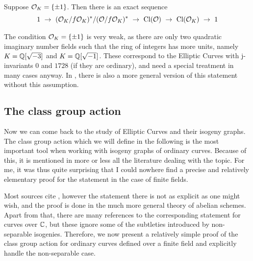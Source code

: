 \begin{corollary}
    \label{prop:class_group_order}
    Suppose $\mathcal{O}_K = \{ \pm 1 \}$. Then there is an exact sequence
    \begin{equation*}
        1 \ \to \ (\O_K/f\O_K)^*/(\O/f\O_K)^* \ \to \ \Cl(\O) \ \to \ \Cl(\O_K) \ \to \ 1
    \end{equation*}
\end{corollary}
The condition $\mathcal{O}_K = \{ \pm 1 \}$ is very weak, as there are only two quadratic imaginary number fields such that the ring of integers has more units, namely $K = \mathbb{Q}[\sqrt{-3}]$ and $K = \mathbb{Q}[\sqrt{-1}]$.
These correspond to the Elliptic Curves with j-invariants $0$ and $1728$ (if they are ordinary), and need a special treatment in many cases anyway.
In \cite{neukirch}, there is also a more general version of this statement without this assumption.

\subsection{The class group action}
Now we can come back to the study of Elliptic Curves and their isogeny graphs.
The class group action which we will define in the following is the most important tool when working with isogeny graphs of ordinary curves.
Because of this, it is mentioned in more or less all the literature dealing with the topic.
For me, it was thus quite surprising that I could nowhere find a precise and relatively elementary proof for the statement in the case of finite fields.

Most sources cite \cite[Thm~4.5]{class_group_action_waterhouse}, however the statement there is not as explicit as one might wish, and the proof is done in the much more general theory of abelian schemes.
Apart from that, there are many references to the corresponding statement for curves over $\mathbb{C}$, but these ignore some of the subtleties introduced by non-separable isogenies. 
Therefore, we now present a relatively simple proof of the class group action for ordinary curves defined over a finite field and explicitly handle the non-separable case.

